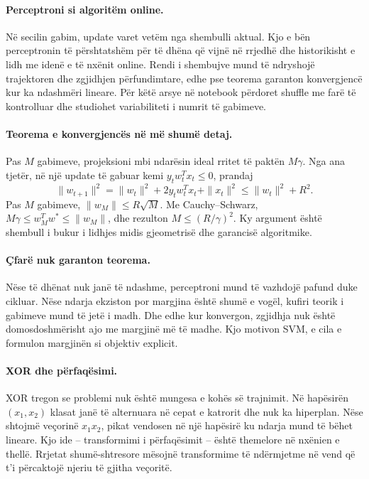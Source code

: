 \documentclass[12pt,a4paper,oneside]{book}
\begin{document}
\paragraph{Perceptroni si algoritëm online.}
Në secilin gabim, update varet vetëm nga shembulli aktual. Kjo e bën perceptronin të përshtatshëm për të dhëna që vijnë në rrjedhë dhe historikisht e lidh me idenë e të nxënit online. Rendi i shembujve mund të ndryshojë trajektoren dhe zgjidhjen përfundimtare, edhe pse teorema garanton konvergjencë kur ka ndashmëri lineare. Për këtë arsye në notebook përdoret shuffle me farë të kontrolluar dhe studiohet variabiliteti i numrit të gabimeve.

\paragraph{Teorema e konvergjencës në më shumë detaj.}
Pas $M$ gabimeve, projeksioni mbi ndarësin ideal rritet të paktën $M\gamma$. Nga ana tjetër, në një update të gabuar kemi $y_t w_t^Tx_t\le0$, prandaj
\[
\|w_{t+1}\|^2=\|w_t\|^2+2y_tw_t^Tx_t+\|x_t\|^2\le\|w_t\|^2+R^2.
\]
Pas $M$ gabimeve, $\|w_M\|\le R\sqrt M$. Me Cauchy--Schwarz,
$M\gamma\le w_M^Tw^*\le\|w_M\|$, dhe rezulton $M\le(R/\gamma)^2$. Ky argument është shembull i bukur i lidhjes midis gjeometrisë dhe garancisë algoritmike.

\paragraph{Çfarë nuk garanton teorema.}
Nëse të dhënat nuk janë të ndashme, perceptroni mund të vazhdojë pafund duke cikluar. Nëse ndarja ekziston por margjina është shumë e vogël, kufiri teorik i gabimeve mund të jetë i madh. Dhe edhe kur konvergon, zgjidhja nuk është domosdoshmërisht ajo me margjinë më të madhe. Kjo motivon SVM, e cila e formulon margjinën si objektiv explicit.

\paragraph{XOR dhe përfaqësimi.}
XOR tregon se problemi nuk është mungesa e kohës së trajnimit. Në hapësirën $(x_1,x_2)$ klasat janë të alternuara në cepat e katrorit dhe nuk ka hiperplan. Nëse shtojmë veçorinë $x_1x_2$, pikat vendosen në një hapësirë ku ndarja mund të bëhet lineare. Kjo ide -- transformimi i përfaqësimit -- është themelore në nxënien e thellë. Rrjetat shumë-shtresore mësojnë transformime të ndërmjetme në vend që t'i përcaktojë njeriu të gjitha veçoritë.
\end{document}
